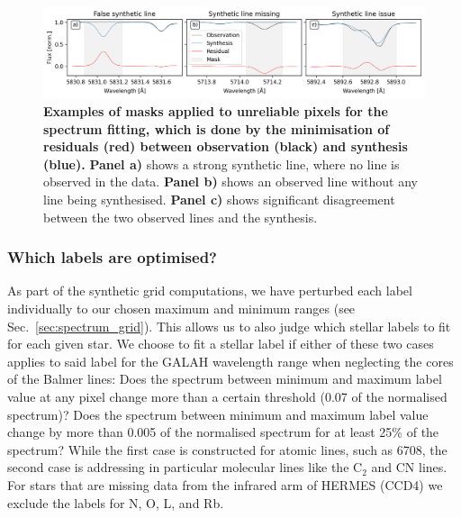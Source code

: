 \documentclass[
  journal=pasa,
  manuscript=research-paper, %
  year=2023,
  volume=37
]{cup-journal}
\newcommand\ion[2]{\text{#1\,\textsc{\lowercase{#2}}}}	%
\begin{document}
\begin{figure}[ht]
\centering  
\includegraphics[width=\textwidth]{figures/example_masking_sun.png}
\caption{\textbf{Examples of masks applied to unreliable pixels for the spectrum fitting, which is done by the minimisation of residuals (red) between observation (black) and synthesis (blue).} \textbf{Panel a)} shows a strong synthetic line, where no line is observed in the data. \textbf{Panel b)} shows an observed line without any line being synthesised. \textbf{Panel c)} shows significant disagreement between the two observed lines and the synthesis.} \label{fig:example_masking_sun}
\end{figure}

\subsubsection{Which labels are optimised?} \label{sec:which_labels_are_optimised}


As part of the synthetic grid computations, we have perturbed each label individually to our chosen maximum and minimum ranges (see Sec.~\ref{sec:spectrum_grid}). This allows us to also judge which stellar labels to fit for each given star. We choose to fit a stellar label if either of these two cases applies to said label for the GALAH wavelength range when neglecting the cores of the Balmer lines: Does the spectrum between minimum and maximum label value at any pixel change more than a certain threshold (0.07 of the normalised spectrum)? Does the spectrum between minimum and maximum label value change by more than 0.005 of the normalised spectrum for at least 25\% of the spectrum? While the first case is constructed for atomic lines, such as \ion{Li}{i} 6708, the second case is addressing in particular molecular lines like the $\mathrm{C_2}$ and $\mathrm{CN}$ lines. For stars that are missing data from the infrared arm of HERMES (CCD4) we exclude the 
labels for N, O, L, and Rb.
\end{document}

